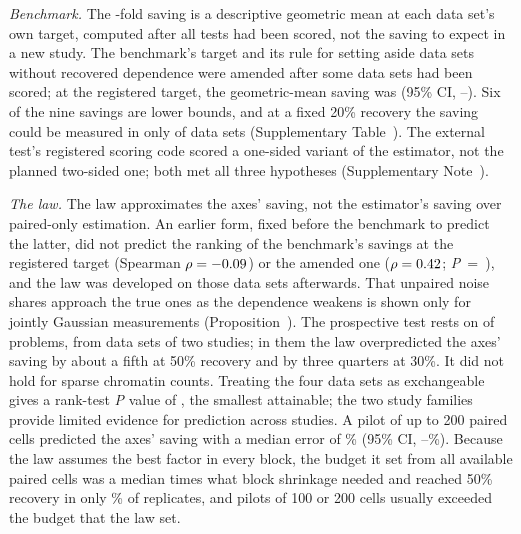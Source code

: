 \documentclass[pdflatex,sn-vancouver-num,iicol]{sn-jnl}
\begin{document}
\textit{Benchmark.} The \SyGeo-fold saving is a descriptive geometric mean at each data set's own target, computed after all tests had been scored, not the saving to expect in a new study. The benchmark's target and its rule for setting aside data sets without recovered dependence were amended after some data sets had been scored; at the registered target, the geometric-mean saving was \GenFrozenGOne{} (95\% CI, \GenFrozenGOneLo--\GenFrozenGOneHi). Six of the nine savings are lower bounds, and at a fixed 20\% recovery the saving could be measured in only \RvFixedTwentyN{} of \RvFixedSets{} data sets (Supplementary Table~). The external test's registered scoring code scored a one-sided variant of the estimator, not the planned two-sided one; both met all three hypotheses (Supplementary Note~).

\textit{The law.} The law approximates the axes' saving, not the estimator's saving over paired-only estimation. An earlier form, fixed before the benchmark to predict the latter, did not predict the ranking of the benchmark's savings at the registered target (Spearman $\rho=-0.09$) or the amended one ($\rho=0.42$; \textit{P}~=~\GenLawP), and the law was developed on those data sets afterwards. That unpaired noise shares approach the true ones as the dependence weakens is shown only for jointly Gaussian measurements (Proposition~). The prospective test rests on \PredNEstimable{} of \PredNProblems{} problems, from \PredNEstimableData{} data sets of two studies; in them the law overpredicted the axes' saving by about a fifth at 50\% recovery and by three quarters at 30\%. It did not hold for sparse chromatin counts. Treating the four data sets as exchangeable gives a rank-test \textit{P} value of \RvLawHalfMeansP{}, the smallest attainable; the two study families provide limited evidence for prediction across studies. A pilot of up to 200 paired cells predicted the axes' saving with a median error of \PredPilotErr\% (95\% CI, \PredPilotErrLo--\PredPilotErrHi\%). Because the law assumes the best factor in every block, the budget it set from all available paired cells was a median \RvPilotHalfResRatio{} times what block shrinkage needed and reached 50\% recovery in only \RvPilotHalfResReached\% of replicates, and pilots of 100 or 200 cells usually exceeded the budget that the law set.
\end{document}
